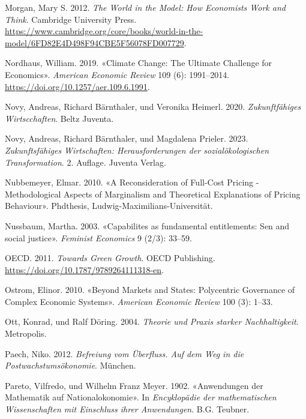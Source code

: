 \documentclass[
  nswissgerman,
  a4paper,
  DIV=11,
  numbers=noendperiod,
  oneside,
  openany]{scrreprt}
\newlength{\cslhangindent}
\newenvironment{CSLReferences}[2] %
 {\begin{list}{}{%
  \setlength{\itemindent}{0pt}
  \setlength{\leftmargin}{0pt}
  \setlength{\parsep}{0pt}
  \ifodd #1
   \setlength{\leftmargin}{\cslhangindent}
   \setlength{\itemindent}{-1\cslhangindent}
  \fi
  \setlength{\itemsep}{#2\baselineskip}}}
 {\end{list}}
\begin{document}
\begin{CSLReferences}{1}{1}
Morgan, Mary S. 2012. \emph{The World in the Model: How Economists Work
and Think}. Cambridge University Press.
\url{https://www.cambridge.org/core/books/world-in-the-model/6FD82E4D498F94CBE5F56078FD007729}.

Nordhaus, William. 2019. {«Climate Change: The Ultimate Challenge for
Economics»}. \emph{American Economic Review} 109 (6): 1991--2014.
\url{https://doi.org/10.1257/aer.109.6.1991}.

Novy, Andreas, Richard Bärnthaler, und Veronika Heimerl. 2020.
\emph{Zukunftfähiges Wirtscchaften}. Beltz Juventa.

Novy, Andreas, Richard Bärnthaler, und Magdalena Prieler. 2023.
\emph{Zukunftsfähiges Wirtschaften: Herausforderungen der
sozialökologischen Transformation}. 2. Auflage. Juventa Verlag.

Nubbemeyer, Elmar. 2010. {«A Reconsideration of Full-Cost Pricing -
Methodological Aspects of Marginalism and Theoretical Explanations of
Pricing Behaviour»}. Phdthesis, Ludwig-Maximilians-Universität.

Nussbaum, Martha. 2003. {«Capabilites as fundamental entitlements: Sen
and social justice»}. \emph{Feminist Economics} 9 (2/3): 33--59.

OECD. 2011. \emph{Towards {Green} {Growth}}. OECD Publishing.
\url{https://doi.org/10.1787/9789264111318-en}.

Ostrom, Elinor. 2010. {«Beyond {Markets} and {States}: {Polycentric}
{Governance} of {Complex} {Economic} {Systems}»}. \emph{American
Economic Review} 100 (3): 1--33.

Ott, Konrad, und Ralf Döring. 2004. \emph{Theorie und Praxis starker
Nachhaltigkeit}. Metropolis.

Paech, Niko. 2012. \emph{Befreiung vom Überfluss. Auf dem Weg in die
Postwachstumsökonomie}. München.

Pareto, Vilfredo, und Wilhelm Franz Meyer. 1902. {«Anwendungen der
Mathematik auf Nationalokonomie»}. In \emph{Encyklopädie der
mathematischen Wissenschaften mit Einschluss ihrer Anwendungen}. B.G.
Teubner.


\end{CSLReferences}
\end{document}
